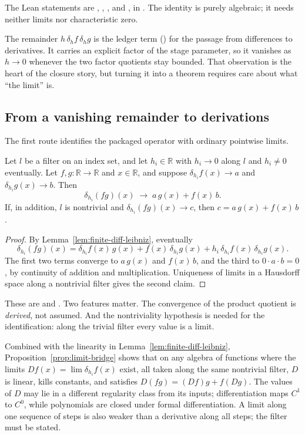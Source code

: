\noindent The Lean statements are , , , and , in .
The identity is purely algebraic; it needs neither limits nor characteristic zero.

The remainder $h\,\delta_hf\,\delta_hg$ is the ledger term (\Psix) for the passage from differences to derivatives.
It carries an explicit factor of the stage parameter, so it vanishes as $h\to 0$ whenever the two factor quotients stay bounded.
That observation is the heart of the closure story, but turning it into a theorem requires care about what ``the limit'' is.

\subsection{From a vanishing remainder to derivations}
\label{subsec:bridge}
The first route identifies the packaged operator with ordinary pointwise limits.

\begin{proposition}\label{prop:limit-bridge}
Let $l$ be a filter on an index set, and let $h_i\in\mathbb R$ with $h_i\to 0$ along $l$ and $h_i\ne 0$ eventually.
Let $f,g:\mathbb R\to\mathbb R$ and $x\in\mathbb R$, and suppose $\delta_{h_i}f(x)\to a$ and $\delta_{h_i}g(x)\to b$. Then
\[
  \delta_{h_i}(fg)(x)\;\longrightarrow\;a\,g(x)+f(x)\,b .
\]
If, in addition, $l$ is nontrivial and $\delta_{h_i}(fg)(x)\to c$, then $c=a\,g(x)+f(x)\,b$.
\end{proposition}

\begin{proof}
By Lemma~\ref{lem:finite-diff-leibniz}, eventually
\[
  \delta_{h_i}(fg)(x)=\delta_{h_i}f(x)\,g(x)+f(x)\,\delta_{h_i}g(x)+h_i\,\delta_{h_i}f(x)\,\delta_{h_i}g(x).
\]
The first two terms converge to $a\,g(x)$ and $f(x)\,b$, and the third to $0\cdot a\cdot b=0$, by continuity of addition and multiplication. Uniqueness of limits in a Hausdorff space along a nontrivial filter gives the second claim.
\end{proof}

\noindent These are  and .
Two features matter.
The convergence of the product quotient is \emph{derived}, not assumed.
And the nontriviality hypothesis is needed for the identification: along the trivial filter every value is a limit.

Combined with the linearity in Lemma~\ref{lem:finite-diff-leibniz}, Proposition~\ref{prop:limit-bridge} shows that on any algebra of functions where the limits $D f(x)=\lim\delta_{h_i}f(x)$ exist, all taken along the same nontrivial filter, $D$ is linear, kills constants, and satisfies $D(fg)=(Df)g+f(Dg)$.
The values of $D$ may lie in a different regularity class from its inputs; differentiation maps $C^1$ to $C^0$, while polynomials are closed under formal differentiation.
A limit along one sequence of steps is also weaker than a derivative along all steps; the filter must be stated.

